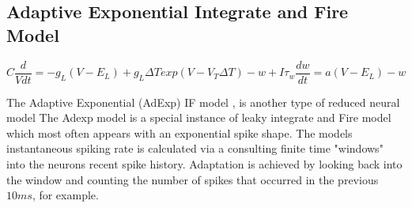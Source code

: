\subsection{Adaptive Exponential Integrate and Fire Model}
\begin{equation}

C\frac{d}{Vdt}=-g_{L}(V-E_{L})+
g_{L} \Delta Texp(V-V_{T} \Delta T)-w+I

\tau_{w}\frac{dw}{dt} = a(V-E_{L})-w 
\end{equation}

The Adaptive Exponential (AdExp) IF model \cite{brette2005adaptive}, is another type of reduced neural model
The Adexp model is a special instance of leaky integrate and Fire model which most often appears with an exponential spike shape.
The models instantaneous spiking rate is calculated via a consulting finite time "windows" into the neurons recent spike history.
Adaptation is achieved by looking back into the window and counting the number of spikes that occurred in the previous $10ms$, for example. 
